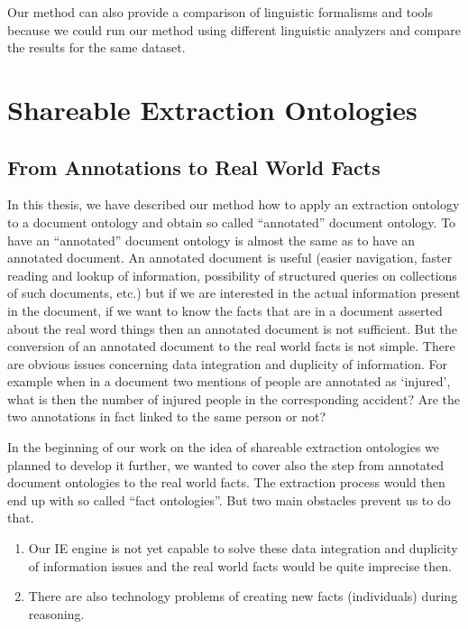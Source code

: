 Our method can also provide a comparison of linguistic formalisms and tools because we could run our method using different linguistic analyzers and compare the results for the same dataset.


\section{Shareable Extraction Ontologies} 

\subsection{From Annotations to Real World Facts} \label{sec:onto_discuss}


In this thesis, we have described our method how to apply an extraction ontology to a document ontology and obtain so called ``annotated'' document ontology. To have an ``annotated'' document ontology is almost the same as to have an annotated document. An annotated document is useful (easier navigation, faster reading and lookup of information, possibility of structured queries on collections of such documents, etc.) but if we are interested in the actual information present in the document, if we want to know the facts that are in a document asserted about the real word things then an annotated document is not sufficient. But the conversion of an annotated document to the real world facts is not simple.
There are obvious issues concerning data integration and duplicity of information. For example when in a document two mentions of people are annotated as `injured', what is then the number of injured people in the corresponding accident? Are the two annotations in fact linked to the same person or not?

In the beginning of our work on the idea of shareable extraction ontologies we planned to develop it further, we wanted to cover also the step from annotated document ontologies to the real world facts. The extraction process would then end up with so called ``fact ontologies''. But two main obstacles prevent us to do that.

\begin{enumerate}
	\item Our IE engine is not yet capable to solve these data integration and duplicity of information issues and the real world facts would be quite imprecise then.
	\item There are also technology problems of creating new facts (individuals) during reasoning.
\end{enumerate}

